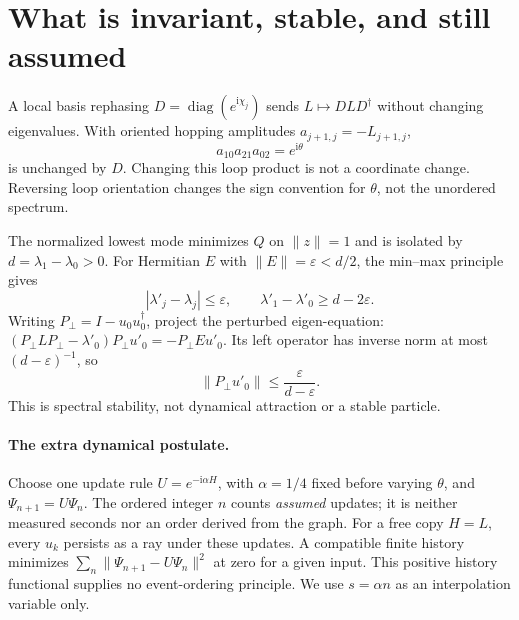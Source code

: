 \documentclass[11pt,a4paper]{article}
\newcommand{\ii}{\mathrm i}
\begin{document}
\newpage
\section{What is invariant, stable, and still assumed}
A local basis rephasing $D=\operatorname{diag}(e^{\ii\chi_j})$ sends
$L\mapsto DLD^\dagger$ without changing eigenvalues. With oriented
hopping amplitudes $a_{j+1,j}=-L_{j+1,j}$,
\begin{equation}
 a_{10}a_{21}a_{02}=e^{\ii\theta}
\end{equation}
is unchanged by $D$. Changing this loop product is not a coordinate
change. Reversing loop orientation changes the sign convention for
$\theta$, not the unordered spectrum.

The normalized lowest mode minimizes $Q$ on $\|z\|=1$ and is isolated
by $d=\lambda_1-\lambda_0>0$. For Hermitian $E$ with
$\|E\|=\varepsilon<d/2$, the min--max principle gives
\begin{equation}
 |\lambda'_j-\lambda_j|\leq\varepsilon,\qquad
 \lambda'_1-\lambda'_0\geq d-2\varepsilon.
\end{equation}
Writing $P_\perp=I-u_0u_0^\dagger$, project the perturbed eigen-equation:
$(P_\perp LP_\perp-\lambda'_0)P_\perp u'_0=-P_\perp Eu'_0$.
Its left operator has inverse norm at most $(d-\varepsilon)^{-1}$, so
\begin{equation}
 \|P_\perp u'_0\|\leq\frac{\varepsilon}{d-\varepsilon}.
\end{equation}
This is spectral stability, not dynamical attraction or a stable particle.

\paragraph{The extra dynamical postulate.}
Choose one update rule $U=e^{-\ii\alpha H}$, with $\alpha=1/4$ fixed
before varying $\theta$, and $\Psi_{n+1}=U\Psi_n$. The ordered integer
$n$ counts \emph{assumed} updates; it is neither measured seconds nor
an order derived from the graph. For a free copy $H=L$, every $u_k$
persists as a ray under these updates. A compatible finite history
minimizes $\sum_n\|\Psi_{n+1}-U\Psi_n\|^2$ at zero for a given input.
This positive history functional supplies no event-ordering principle.
We use $s=\alpha n$ as an interpolation variable only.
\end{document}
